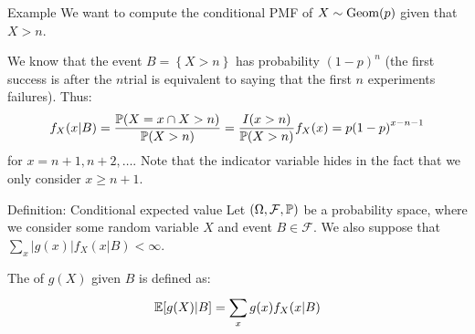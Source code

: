 \documentclass[a4paper]{article}
\begin{document}
\begin{parag}{Example}
    We want to compute the conditional PMF of $X \followsdistr \text{Geom}\left(p\right)$ given that $X > n$.

    We know that the event $B = \left\{X > n\right\}$ has probability $\left(1-p\right)^n$ (the first success is after the $n$\Th trial is equivalent to saying that the first $n$ experiments failures). Thus:
    \[f_X\left(x | B\right) = \frac{\prob\left(X = x \cap X > n\right)}{\prob\left(X > n\right)} = \frac{I\left(x > n\right)}{\prob\left(X > n\right)} f_X\left(x\right) = p\left(1 - p\right)^{x-n-1}\]
    for $x = n+1, n+2, \ldots$. Note that the indicator variable hides in the fact that we only consider $x \geq n+1$.
\end{parag}


\begin{parag}{Definition: Conditional expected value}
    Let $\left(\Omega, \mathcal{F}, \prob\right)$ be a probability space, where we consider some random variable $X$ and event $B \in \mathcal{F}$. We also suppose that $\sum_{x}^{} \left|g\left(x\right)\right| f_X\left(x | B\right) < \infty$.

    The  of $g\left(X\right)$ given $B$ is defined as: 
    \[\exval\left[g\left(X\right) | B\right] = \sum_{x}^{} g\left(x\right) f_X\left(x | B\right)\]
\end{parag}
\end{document}

